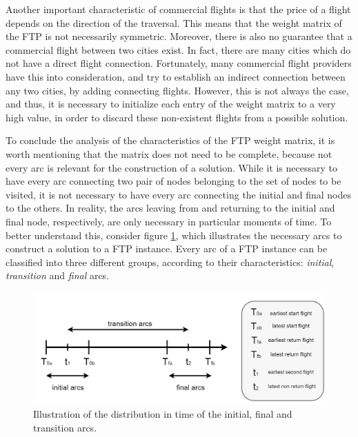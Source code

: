 Another important characteristic of commercial flights is that the price of a flight depends on the direction of the traversal. This means that the weight matrix of the FTP is not necessarily symmetric. Moreover, there is also no guarantee that a commercial flight between two cities exist. In fact, there are many cities which do not have a direct flight connection. Fortunately, many commercial flight providers have this into consideration, and try to establish an indirect connection between any two cities, by adding connecting flights. However, this is not always the case, and thus, it is necessary to initialize each entry of the weight matrix to a very high value, in order to discard these non-existent flights from a possible solution.  

To conclude the analysis of the characteristics of the FTP weight matrix, it is worth mentioning that the matrix does not need to be complete, because not every arc is relevant for the construction of a solution. While it is necessary to have every arc connecting two pair of nodes belonging to the set of nodes to be visited, it is not necessary to have every arc connecting the initial and final nodes to the others. In reality, the arcs leaving from and returning to the initial and final node, respectively, are only necessary in particular moments of time. To better understand this, consider figure \ref{fig:arc_families}, which illustrates the necessary arcs to construct a solution to a FTP instance. Every arc of a FTP instance can be classified into three different groups, according to their characteristics: \textit{initial}, \textit{transition} and \textit{final} arcs.

\begin{figure}[htpb]
  \centering
  \includegraphics[width=\textwidth]{./Figures/system_design/flights_times.png}
  \caption{Illustration of the distribution in time of the initial, final and transition arcs.}
  \label{fig:arc_families} 
\end{figure}

